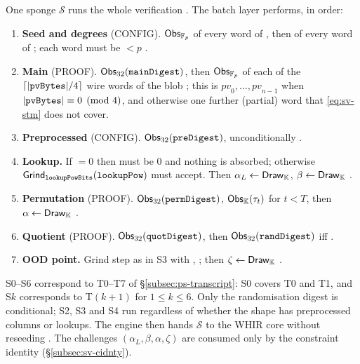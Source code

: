One sponge $\mathcal{S}$ runs the whole verification
. The batch layer
 performs, in order:
\begin{enumerate}
\item[S0.] \textbf{Seed and degrees} (CONFIG). $\mathsf{Obs}_{\mathbb{F}_p}$ of every word of
  , then of every word of ; each word must be
  $<p$  .
\item[S1.] \textbf{Main} (PROOF). $\mathsf{Obs}_{32}(\texttt{mainDigest})$, then
  $\mathsf{Obs}_{\mathbb{F}_p}$ of each of the $\lceil|\texttt{pvBytes}|/4\rceil$ wire words
  of the blob ; this is
  $\mathit{pv}_0,\dots,\mathit{pv}_{n-1}$ when $|\texttt{pvBytes}| \equiv 0 \pmod 4$,
  and otherwise one further (partial) word that \eqref{eq:sv-stm} does not cover.
\item[S2.] \textbf{Preprocessed} (CONFIG). $\mathsf{Obs}_{32}(\texttt{preDigest})$,
  unconditionally .
\item[S3.] \textbf{Lookup.} If $=0$ then 
  must be $0$ and nothing is absorbed; otherwise
  $\mathsf{Grind}_{\texttt{lookupPowBits}}(\texttt{lookupPow})$ must accept. Then
  $\alpha_L \gets \mathsf{Draw}_{\mathbb{K}}$, $\beta \gets \mathsf{Draw}_{\mathbb{K}}$
  .
\item[S4.] \textbf{Permutation} (PROOF). $\mathsf{Obs}_{32}(\texttt{permDigest})$,
  $\mathsf{Obs}_{\mathbb{K}}(\tau_t)$ for $t<T$, then $\alpha \gets \mathsf{Draw}_{\mathbb{K}}$
   .
\item[S5.] \textbf{Quotient} (PROOF). $\mathsf{Obs}_{32}(\texttt{quotDigest})$, then
  $\mathsf{Obs}_{32}(\texttt{randDigest})$ iff 
  .
\item[S6.] \textbf{OOD point.} Grind step as in S3 with ,
  ; then $\zeta \gets \mathsf{Draw}_{\mathbb{K}}$
  .
\end{enumerate}
S0--S6 correspond to T0--T7 of \S\ref{subsec:ps-transcript}: S0 covers T0 and
T1, and S$k$ corresponds to T$(k{+}1)$ for $1 \le k \le 6$. Only the
randomisation digest is conditional; S2, S3 and S4 run regardless of whether the
shape has preprocessed columns or lookups. The engine then hands $\mathcal{S}$ to
the WHIR core without reseeding . The challenges
$(\alpha_L, \beta, \alpha, \zeta)$ are consumed only by the constraint identity
(\S\ref{subsec:sv-cidnty}).


